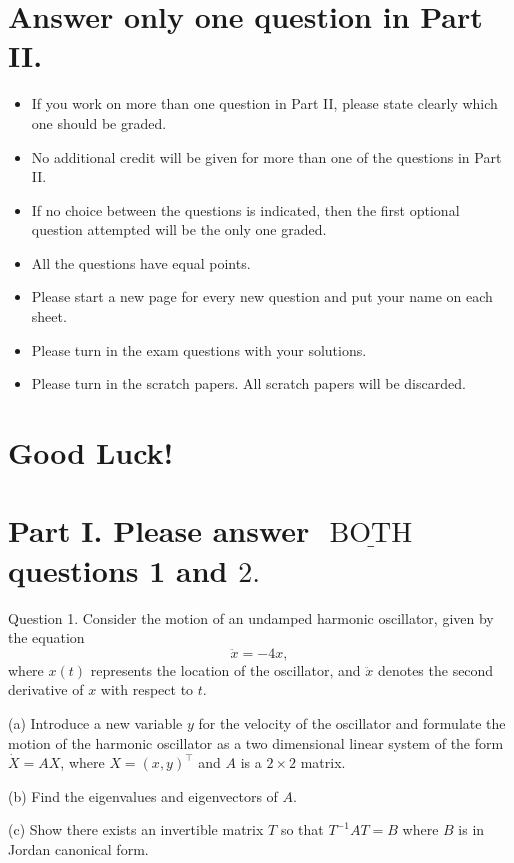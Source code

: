 \documentclass[10pt]{article}
\begin{document}
\section{Answer only one question in Part II.}
\begin{itemize}
  \item If you work on more than one question in Part II, please state clearly which one should be graded.

  \item No additional credit will be given for more than one of the questions in Part II.

  \item If no choice between the questions is indicated, then the first optional question attempted will be the only one graded.

  \item All the questions have equal points.

  \item Please start a new page for every new question and put your name on each sheet.

  \item Please turn in the exam questions with your solutions.

  \item Please turn in the scratch papers. All scratch papers will be discarded.

\end{itemize}
\section{Good Luck!}
\section{Part I. Please answer $\underline{\text { BOTH }}$ questions 1 and $2 .$}
Question 1. Consider the motion of an undamped harmonic oscillator, given by the equation
$$
\ddot{x}=-4 x,
$$
where $x(t)$ represents the location of the oscillator, and $\ddot{x}$ denotes the second derivative of $x$ with respect to $t$.

(a) Introduce a new variable $y$ for the velocity of the oscillator and formulate the motion of the harmonic oscillator as a two dimensional linear system of the form $\dot{X}=A X$, where $X=(x, y)^{\top}$ and $A$ is a $2 \times 2$ matrix.

(b) Find the eigenvalues and eigenvectors of $A$.

(c) Show there exists an invertible matrix $T$ so that $T^{-1} A T=B$ where $B$ is in Jordan canonical form.
\end{document}
